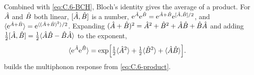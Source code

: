 Combined with \cref{eq:C.6-BCH}, Bloch's identity gives the average of a product. For $\hat{A}$ and $\hat{B}$ both linear, $[\hat{A}, \hat{B}]$ is a number, $\mathrm{e}^{\hat{A}}\mathrm{e}^{\hat{B}} = \mathrm{e}^{\hat{A} + \hat{B}}\mathrm{e}^{[\hat{A}, \hat{B}]/2}$, and $\langle\mathrm{e}^{\hat{A} + \hat{B}}\rangle = \mathrm{e}^{\langle(\hat{A} + \hat{B})^2\rangle/2}$. Expanding $(\hat{A} + \hat{B})^2 = \hat{A}^2 + \hat{B}^2 + \hat{A} \hat{B} + \hat{B} \hat{A}$ and adding $\tfrac12[\hat{A}, \hat{B}] = \tfrac12\langle \hat{A} \hat{B} - \hat{B} \hat{A}\rangle$ to the exponent,
\begin{equation}
  \langle\mathrm{e}^{\hat{A}}\mathrm{e}^{\hat{B}}\rangle = \exp\Bigl[\tfrac12\langle \hat{A}^2\rangle + \tfrac12\langle \hat{B}^2\rangle + \langle \hat{A} \hat{B}\rangle\Bigr] .
  \label{eq:C.6-product}
\end{equation}
 builds the multiphonon response from \cref{eq:C.6-product}.
